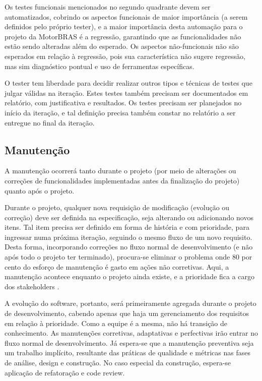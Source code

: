 \documentclass[12pt,journal,compsoc]{IEEEtran}
\begin{document}
Os testes funcionais mencionados no segundo quadrante devem ser automatizados, cobrindo os aspectos funcionais de maior importância (a serem definidos pelo próprio tester), e a maior importância desta automação para o projeto da MotorBRAS é a regressão, garantindo que as funcionalidades não estão sendo alteradas além do esperado. Os aspectos não-funcionais não são esperados em relação à regressão, pois sua característica não sugere regressão, mas sim diagnóstico pontual e uso de ferramentas específicas.

O tester tem liberdade para decidir realizar outros tipos e técnicas de testes que julgar válidas na iteração. Estes testes também precisam ser documentados em relatório, com justificativa e resultados. Os testes precisam ser planejados no início da iteração, e tal definição precisa também constar no relatório a ser entregue no final da iteração.


\subsection{Manutenção}

A manutenção ocorrerá tanto durante o projeto (por meio de alterações ou correções de funcionalidades implementadas antes da finalização do projeto) quanto após o projeto.

Durante o projeto, qualquer nova requisição de modificação (evolução ou correção) deve ser definida na especificação, seja alterando ou adicionando novos itens. Tal item precisa ser definido em forma de história e com prioridade, para ingressar numa próxima iteração, seguindo o mesmo fluxo de um novo requisito. Desta forma, incorporando correções no fluxo normal de desenvolvimento (e não após todo o projeto ter terminado), procura-se eliminar o problema onde 80 por cento do esforço de manutenção é gasto em ações não corretivas. Aqui, a manutenção acontece enquanto o projeto ainda existe, e a prioridade fica a cargo dos stakeholders \cite{schwaber_scrum_2013}. 

A evolução do software, portanto, será primeiramente agregada durante o projeto de desenvolvimento, cabendo apenas que haja um gerenciamento dos requisitos em relação à prioridade. Como a equipe é a mesma, não há transição de conhecimento. As manutenções corretivas, adaptativas e perfectivas irão entrar no fluxo normal de desenvolvimento. Já espera-se que a manutenção preventiva seja um trabalho implícito, resultante das práticas de qualidade e métricas nas fases de análise, design e construção. No caso especial da construção, espera-se aplicação de refatoração e code review.
\end{document}
